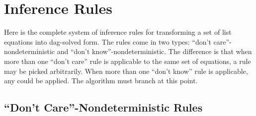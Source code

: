 \documentclass[11pt]{article}
\begin{document}
\section{Inference Rules}\label{appendix:inference}

Here is the complete system of inference rules for transforming a set of list
equations into dag-solved form. The rules come in two types: ``don't
care''-nondeterministic and ``don't know''-nondeterministic. The difference
is that when more than one ``don't care'' rule is applicable to the same
set of equations, a rule may be picked arbitrarily. When more than one ``don't
know'' rule is applicable, any could be applied. The algorithm must branch at
this point.

\subsection{\texorpdfstring{``Don't Care''}{"Don't Care"}-Nondeterministic Rules}
\end{document}
